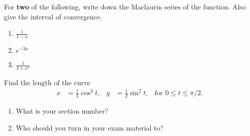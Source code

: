 \begin{problem}
For \textbf{two} of the following, write down the Maclaurin series of the
function. Also give the interval of convergence.
\begin{enumerate}[label=(\alph*)]
\item $\displaystyle\frac{1}{1-x}$
\item $\displaystyle e^{-3x}$
\item $\displaystyle\frac{1}{1+x^2}$
\end{enumerate}
\end{problem}
\begin{problem}
Find the length of the curve
\[
  \begin{aligned}
    x&=\tfrac{1}{3}\cos^3 t,&y&=\tfrac{1}{2}\sin^2t,&\text{for $0\leq t\leq\pi/2$.}
  \end{aligned}
\]
\end{problem}
\begin{problem}
\begin{enumerate}[label=(\alph*)]
\item What is your section number?
\item Who should you turn in your exam material to?
\end{enumerate}
\end{problem}
